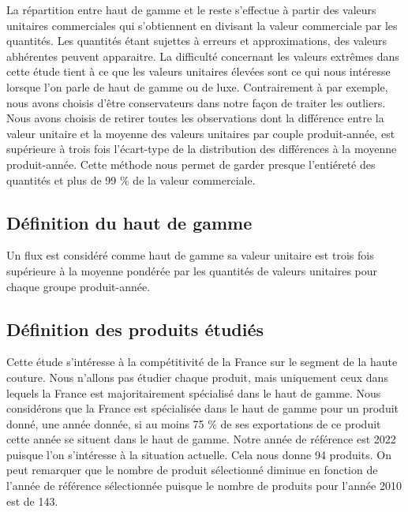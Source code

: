\documentclass[french,10pt,a4paper]{article}
\begin{document}
La répartition entre haut de gamme et le reste s'effectue à partir des valeurs unitaires commerciales qui s'obtiennent en divisant la valeur commerciale par les quantités. Les quantités étant sujettes à erreurs et approximations, des valeurs abhérentes peuvent apparaitre. La difficulté concernant les valeurs extrêmes dans cette étude tient à ce que les valeurs unitaires élevées sont ce qui nous intéresse lorsque l'on parle de haut de gamme ou de luxe. Contrairement à \cite{Fontagne2013} par exemple, nous avons choisis d'être conservateurs dans notre façon de traiter les outliers. Nous avons choisis de retirer toutes les observations dont la différence entre la valeur unitaire et la moyenne des valeurs unitaires par couple produit-année, est supérieure à trois fois l'écart-type de la distribution des différences à la moyenne produit-année. Cette méthode nous permet de garder presque l'entiéreté des quantités et plus de 99 \% de la valeur commerciale.


\subsection{Définition du haut de gamme}

Un flux est considéré comme haut de gamme sa valeur unitaire est trois fois supérieure à la moyenne pondérée par les quantités de valeurs unitaires pour chaque groupe produit-année.

\subsection{Définition des produits étudiés}

Cette étude s'intéresse à la compétitivité de la France sur le segment de la haute couture. Nous n'allons pas étudier chaque produit, mais uniquement ceux dans lequels la France est majoritairement spécialisé dans le haut de gamme. Nous considérons que la France est spécialisée dans le haut de gamme pour un produit donné, une année donnée, si au moins 75 \% de ses exportations de ce produit cette année se situent dans le haut de gamme. Notre année de référence est 2022 puisque l'on s'intéresse à la situation actuelle. Cela nous donne 94 produits. On peut remarquer que le nombre de produit sélectionné diminue en fonction de l'année de référence sélectionnée puisque le nombre de produits pour l'année 2010 est de 143.
\end{document}
